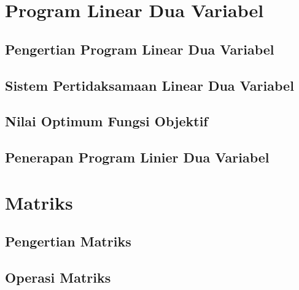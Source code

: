 \documentclass[11pt,fleqn]{book} %
\begin{document}


\chapter{Program Linear Dua Variabel}

\section{Pengertian Program Linear Dua Variabel}

\section{Sistem Pertidaksamaan Linear Dua Variabel}

\section{Nilai Optimum Fungsi Objektif}

\section{Penerapan Program Linier Dua Variabel}



\chapter{Matriks}

\section{Pengertian Matriks}

\section{Operasi Matriks}
\end{document}
